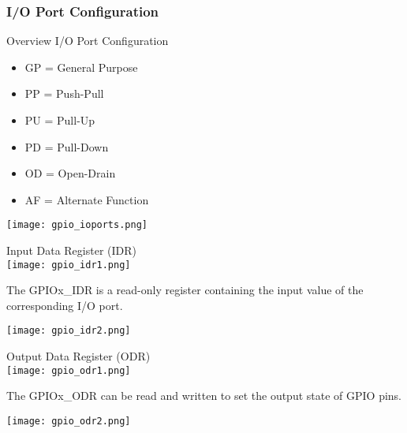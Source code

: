 \subsubsection{I/O Port Configuration}

\begin{definition}{Overview I/O Port Configuration}
        \begin{itemize}
            \item GP = General Purpose
            \item PP = Push-Pull
            \item PU = Pull-Up
            \item PD = Pull-Down
            \item OD = Open-Drain
            \item AF = Alternate Function
        \end{itemize}
        \vspace{3mm}
        \texttt{[image: gpio\_ioports.png]}
\end{definition}

\begin{concept}{Input Data Register (IDR)}\\
    \texttt{[image: gpio\_idr1.png]}

    \begin{minipage}{0.5\linewidth}
    The GPIOx\_IDR is a read-only register containing the input value of the corresponding I/O port.
    \end{minipage}
    \hspace{3mm}
    \begin{minipage}{0.4\linewidth}
        \texttt{[image: gpio\_idr2.png]}
    \end{minipage}
\end{concept}

\begin{concept}{Output Data Register (ODR)}\\
    \texttt{[image: gpio\_odr1.png]}

    \begin{minipage}{0.5\linewidth}
    The GPIOx\_ODR can be read and written to set the output state of GPIO pins.
    \end{minipage}
    \hspace{3mm}
    \begin{minipage}{0.4\linewidth}
    \texttt{[image: gpio\_odr2.png]}
    \end{minipage}
\end{concept}



